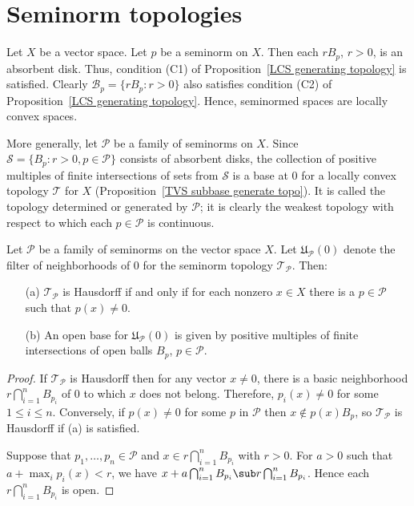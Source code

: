 \section{Seminorm topologies}
Let $X$ be a vector space. Let $p$ be a seminorm on $X$. Then each $rB_p$, $r>0$, is an absorbent disk. Thus, condition (C1) of Proposition~\ref{LCS generating topology} is satisfied. Clearly $\mathcal{B}_p=\{rB_p:r>0\}$ also satisfies condition (C2) of Proposition~\ref{LCS generating topology}. Hence, seminormed spaces are locally convex spaces.\par
More generally, let $\mathscr{P}$ be a family of seminorms on $X$. Since $\mathcal{S}=\{B_p:r>0,p\in\mathscr{P}\}$ consists of absorbent disks, the collection of positive multiples of finite intersections of sets from $\mathcal{S}$ is a base at $0$ for a locally convex topology $\mathcal{T}$ for $X$ (Proposition~\ref{TVS subbase generate topo}). It is called the topology determined or generated by $\mathscr{P}$; it is clearly the weakest topology with respect to which each $p\in\mathscr{P}$ is continuous.
\begin{proposition}\label{seminorm topo Hausdorff iff}
Let $\mathscr{P}$ be a family of seminorms on the vector space $X$. Let $\mathfrak{U}_{\mathcal{P}}(0)$ denote the filter of neighborhoods of $0$ for the seminorm topology $\mathcal{T}_{\mathscr{P}}$. Then:
\begin{itemize}
\item[(a)] $\mathcal{T}_{\mathscr{P}}$ is Hausdorff if and only if for each nonzero $x\in X$ there is a $p\in\mathscr{P}$ such that $p(x)\neq 0$.
\item[(b)] An open base for $\mathfrak{U}_{\mathscr{P}}(0)$ is given by positive multiples of finite intersections of open balls $B_p$, $p\in\mathscr{P}$.
\end{itemize}
\end{proposition}
\begin{proof}
If $\mathcal{T}_{\mathscr{P}}$ is Hausdorff then for any vector $x\neq 0$, there is a basic neighborhood $r\bigcap_{i=1}^{n}B_{p_i}$ of $0$ to which $x$ does not belong. Therefore, $p_i(x)\neq 0$ for some $1\leq i\leq n$. Conversely, if $p(x)\neq 0$ for some $p$ in $\mathscr{P}$ then $x\notin p(x)B_{p}$, so $\mathcal{T}_{\mathscr{P}}$ is Hausdorff if (a) is satisfied.\par
Suppose that $p_1,\dots,p_n\in\mathscr{P}$ and $x\in r\bigcap_{i=1}^{n}B_{p_i}$ with $r>0$. For $a>0$ such that $a+\max_ip_i(x)<r$, we have $x+a\bigcap_{i=1}^{n}B_{p_i}\sub r\bigcap_{i=1}^{n}B_{p_i}$. Hence each $r\bigcap_{i=1}^{n}B_{p_i}$ is open.
\end{proof}
